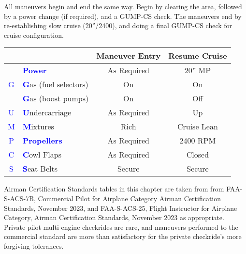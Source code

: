 {All maneuvers begin and end the same way. Begin by clearing the area, followed by a power change (if required),
and a GUMP-CS check. The maneuvers end by re-establishing slow cruise (20''/2400), and doing a final GUMP-CS
check for cruise configuration.

\begin{table}[H]
\centering
\begin{tabular}{|c|l|c|c|}
\hline
                    &                                                 & \textbf{Maneuver Entry} & \textbf{Resume Cruise} \\ \hline
                    & \textcolor{blue}{\textbf{Power}}                & As Required             & 20'' MP                \\ \hline
\textcolor{blue}{G} & \textcolor{blue}{\textbf{G}}as (fuel selectors) & On                      & On                     \\
                    & \textcolor{blue}{\textbf{G}}as (boost pumps)    & On                      & Off                    \\ \hline
\textcolor{blue}{U} & \textcolor{blue}{\textbf{U}}ndercarriage        & As Required             & Up                     \\ \hline
\textcolor{blue}{M} & \textcolor{blue}{\textbf{M}}ixtures             & Rich                    & Cruise Lean            \\ \hline
\textcolor{blue}{P} & \textcolor{blue}{\textbf{Propellers}}           & As Required             & 2400 RPM               \\ \hline
\textcolor{blue}{C} & \textcolor{blue}{\textbf{C}}owl Flaps           & As Required             & Closed                 \\ \hline
\textcolor{blue}{S} & \textcolor{blue}{\textbf{S}}eat Belts           & Secure                  & Secure                 \\ \hline
\end{tabular}
\end{table}

Airman Certification Standards tables in this chapter are taken from from FAA-S-ACS-7B, Commercial Pilot for Airplane Category Airman Certification Standards, November 2023, and  FAA-S-ACS-25, Flight Instructor for Airplane Category, Airman Certification Standards, November 2023 as appropriate. Private pilot multi engine checkrides are rare, and maneuvers performed to the commercial standard are more than satisfactory for the private checkride's more forgiving tolerances.

}
